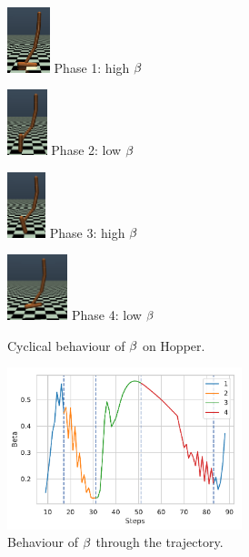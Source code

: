 \begin{figure}[h]
\centering
    \centering
    \begin{minipage}[b]{0.4\linewidth}
    \centering
    \includegraphics[width=\textwidth,height=1.9cm]{fig/phase_0.png}
    Phase 1: high $\beta$
    \label{fig:phase_0}
    \end{minipage}
    \hspace{0.05cm}
    \begin{minipage}[b]{0.4\linewidth}
    \centering
    \includegraphics[width=\textwidth,height=1.9cm]{fig/phase_1.png}
    Phase 2: low $\beta$
    \label{fig:phase_1}
    \end{minipage}
    \hspace{0.02cm}
    \begin{minipage}[b]{0.4\linewidth}
    \centering
    \includegraphics[width=\textwidth,height=1.9cm]{fig/phase_2.png}
    Phase 3: high $\beta$
    \label{fig:phase_2}
    \end{minipage}
    \vspace{0.02cm}
    \hspace{0.02cm}
    \begin{minipage}[b]{0.4\linewidth}
    \centering
    \includegraphics[width=\textwidth,height=1.9cm]{fig/phase_3.png}
     Phase 4: low $\beta$
    \label{fig:phase_3}
    \end{minipage}
    \hspace{0.02cm}
    \caption{Cyclical behaviour of $\beta$ on Hopper.}
    \label{fig:visual_hopper}
\end{figure}
\begin{figure}
    \centering
    \includegraphics[width=\textwidth,height=4.7cm]{fig/beta_hopper.pdf}
    \caption{Behaviour of $\beta$ through the trajectory.}
    \label{fig:cyle_hopper}
\end{figure}
